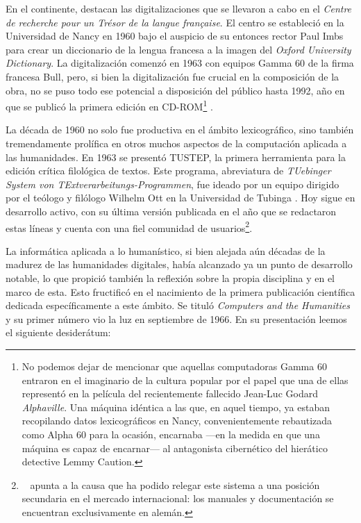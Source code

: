 En el continente, destacan las digitalizaciones que se llevaron a cabo en el \textit{Centre de recherche pour un Trésor de la langue française}. El centro se estableció en la Universidad de Nancy en 1960 bajo el auspicio de su entonces rector Paul Imbs para crear un diccionario de la lengua francesa a la imagen del \textit{Oxford University Dictionary}. La digitalización comenzó en 1963 con equipos Gamma 60 de la firma francesa Bull, pero, si bien la digitalización fue crucial en la composición de la obra, no se puso todo ese potencial a disposición del público hasta 1992, año en que se publicó la primera edición en CD-ROM\footnote{No podemos dejar de mencionar que aquellas computadoras Gamma 60 entraron en el imaginario de la cultura popular por el papel que una de ellas representó en la película del recientemente fallecido Jean-Luc Godard \textit{Alphaville}. Una máquina idéntica a las que, en aquel tiempo, ya estaban recopilando datos lexicográficos en Nancy, convenientemente rebautizada como Alpha 60 para la ocasión, encarnaba —en la medida en que una máquina es capaz de encarnar— al antagonista cibernético del hierático detective Lemmy Caution.} \parencite{papelier2005}.

La década de 1960 no solo fue productiva en el ámbito lexicográfico, sino también tremendamente prolífica en otros muchos aspectos de la computación aplicada a las humanidades. En 1963 se presentó TUSTEP, la primera herramienta para la edición crítica filológica de textos. Este programa, abreviatura de \textit{TUebinger System von TExtverarbeitungs-Programmen}, fue ideado por un equipo dirigido por el teólogo y filólogo Wilhelm Ott en la Universidad de Tubinga \parencite[7]{hockey2004}. Hoy sigue en desarrollo activo, con su última versión \parencite{tustep2023} publicada en el año que se redactaron estas líneas y cuenta con una fiel comunidad de usuarios\footnote{\citeauthor{valdes2014b}~\parencite*[p.~39, n.~43]{valdes2014b} apunta a la causa que ha podido relegar este sistema a una posición secundaria en el mercado internacional: los manuales y documentación se encuentran exclusivamente en alemán.}.

La informática aplicada a lo humanístico, si bien alejada aún décadas de la madurez de las humanidades digitales, había alcanzado ya un punto de desarrollo notable, lo que propició también la reflexión sobre la propia disciplina y en el marco de esta. Esto fructificó en el nacimiento de la primera publicación científica dedicada específicamente a este ámbito. Se tituló \textit{Computers and the Humanities} y su primer número vio la luz en septiembre de 1966. En su presentación leemos el siguiente desiderátum:

